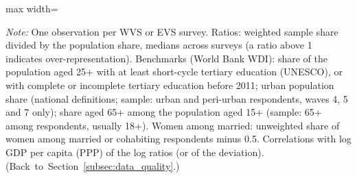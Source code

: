 \documentclass[12pt]{article}
\begin{document}
\begin{table}[htbp]
    \centering
    \caption{Representativeness of WVS/EVS samples: sample shares relative to population benchmarks.}\label{tab:representativeness}
    \begin{adjustbox}{max width=\textwidth}
    
    \end{adjustbox}
    \begin{minipage}{\textwidth}\footnotesize \textit{Note:} One observation per WVS or EVS survey. Ratios: weighted sample share divided by the population share, medians across surveys (a ratio above 1 indicates over-representation). Benchmarks (World Bank WDI): share of the population aged 25+ with at least short-cycle tertiary education (UNESCO), or with complete or incomplete tertiary education \citep{barro_new_2013} before 2011; urban population share (national definitions; sample: urban and peri-urban respondents, waves 4, 5 and 7 only); share aged 65+ among the population aged 15+ (sample: 65+ among respondents, usually 18+). Women among married: unweighted share of women among married or cohabiting respondents minus 0.5. Correlations with log GDP per capita (PPP) of the log ratios (or of the deviation). \hfill(Back~to~Section~\ref{subsec:data_quality}.)\end{minipage}
\end{table}
\end{document}
